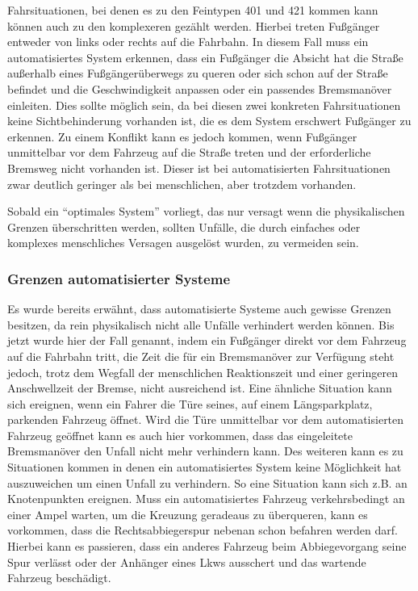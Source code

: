 Fahrsituationen, bei denen es zu den Feintypen 401 und 421 kommen kann können auch zu den komplexeren gezählt werden. Hierbei treten Fußgänger entweder von links oder rechts auf die Fahrbahn. In diesem Fall muss ein automatisiertes System erkennen, dass ein Fußgänger die Absicht hat die Straße außerhalb eines Fußgängerüberwegs zu queren oder sich schon auf der Straße befindet und die Geschwindigkeit anpassen oder ein passendes Bremsmanöver einleiten. Dies sollte möglich sein, da bei diesen zwei konkreten Fahrsituationen keine Sichtbehinderung vorhanden ist, die es dem System erschwert Fußgänger zu erkennen. Zu einem Konflikt kann es jedoch kommen, wenn Fußgänger unmittelbar vor dem Fahrzeug auf die Straße treten und der erforderliche Bremsweg nicht vorhanden ist. Dieser ist bei automatisierten Fahrsituationen zwar deutlich geringer als bei menschlichen, aber trotzdem vorhanden.

Sobald ein \enquote{optimales System} vorliegt, das nur versagt wenn die physikalischen Grenzen überschritten werden, sollten Unfälle, die durch einfaches oder komplexes menschliches Versagen ausgelöst wurden, zu vermeiden sein.

\subsubsection{Grenzen automatisierter Systeme}
Es wurde bereits erwähnt, dass automatisierte Systeme auch gewisse Grenzen besitzen, da rein physikalisch nicht alle Unfälle verhindert werden können. Bis jetzt wurde hier der Fall genannt, indem ein Fußgänger direkt vor dem Fahrzeug auf die Fahrbahn tritt, die Zeit die für ein Bremsmanöver zur Verfügung steht jedoch, trotz dem Wegfall der menschlichen Reaktionszeit und einer geringeren Anschwellzeit der Bremse, nicht ausreichend ist. Eine ähnliche Situation kann sich ereignen, wenn ein Fahrer die Türe seines, auf einem Längsparkplatz, parkenden Fahrzeug öffnet. Wird die Türe unmittelbar vor dem automatisierten Fahrzeug geöffnet kann es auch hier vorkommen, dass das eingeleitete Bremsmanöver den Unfall nicht mehr verhindern kann. Des weiteren kann es zu Situationen kommen in denen ein automatisiertes System keine Möglichkeit hat auszuweichen um einen Unfall zu verhindern. So eine Situation kann sich z.B. an Knotenpunkten ereignen. Muss ein automatisiertes Fahrzeug verkehrsbedingt an einer Ampel warten, um die Kreuzung geradeaus zu überqueren, kann es vorkommen, dass die Rechtsabbiegerspur nebenan schon befahren werden darf. Hierbei kann es passieren, dass ein anderes Fahrzeug beim Abbiegevorgang seine Spur verlässt oder der Anhänger eines Lkws ausschert und das wartende Fahrzeug beschädigt.

